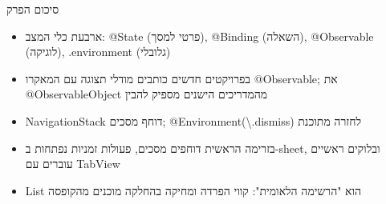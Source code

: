 \begin{tcbsummary}{סיכום הפרק}
\begin{itemize}
  \item ארבעת כלי המצב: @State (פרטי למסך), @Binding (השאלה), @Observable (לוגיקה), .environment (גלובלי)
  \item בפרויקטים חדשים כותבים מודלי תצוגה עם המאקרו @Observable; את @ObservableObject מהמדריכים הישנים מספיק להבין
  \item NavigationStack דוחף מסכים; @Environment(\textbackslash{}.dismiss) לחזרה מתוכנת
  \item בזרימה הראשית דוחפים מסכים, פעולות זמניות נפתחות ב-sheet, ובלוקים ראשיים עוברים עם TabView
  \item List הוא "הרשימה הלאומית": קווי הפרדה ומחיקה בהחלקה מוכנים מהקופסה
\end{itemize}

\end{tcbsummary}
